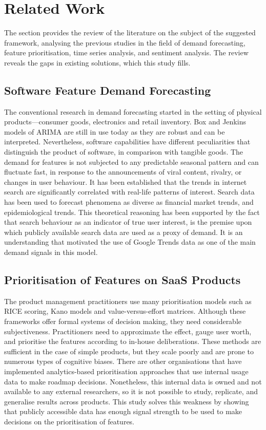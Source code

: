 \section{Related Work}

The section provides the review of the literature on the subject of the suggested framework, analysing the previous studies in the field of demand forecasting, feature prioritisation, time series analysis, and sentiment analysis. The review reveals the gaps in existing solutions, which this study fills.

\subsection{Software Feature Demand Forecasting}
The conventional research in demand forecasting started in the setting of physical products---consumer goods, electronics and retail inventory. Box and Jenkins models of ARIMA are still in use today as they are robust and can be interpreted. Nevertheless, software capabilities have different peculiarities that distinguish the product of software, in comparison with tangible goods. The demand for features is not subjected to any predictable seasonal pattern and can fluctuate fast, in response to the announcements of viral content, rivalry, or changes in user behaviour. It has been established that the trends in internet search are significantly correlated with real-life patterns of interest. Search data has been used to forecast phenomena as diverse as financial market trends, and epidemiological trends. This theoretical reasoning has been supported by the fact that search behaviour as an indicator of true user interest, is the premise upon which publicly available search data are used as a proxy of demand. It is an understanding that motivated the use of Google Trends data as one of the main demand signals in this model.

\subsection{Prioritisation of Features on SaaS Products}
The product management practitioners use many prioritisation models such as RICE scoring, Kano models and value-versus-effort matrices. Although these frameworks offer formal systems of decision making, they need considerable subjectiveness. Practitioners need to approximate the effect, gauge user worth, and prioritise the features according to in-house deliberations. These methods are sufficient in the case of simple products, but they scale poorly and are prone to numerous types of cognitive biases. There are other organisations that have implemented analytics-based prioritisation approaches that use internal usage data to make roadmap decisions. Nonetheless, this internal data is owned and not available to any external researchers, so it is not possible to study, replicate, and generalise results across products. This study solves this weakness by showing that publicly accessible data has enough signal strength to be used to make decisions on the prioritisation of features.


